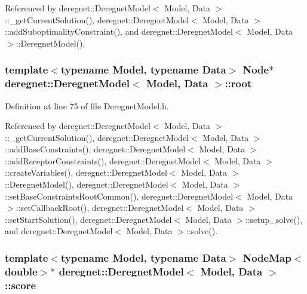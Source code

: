 Referenced by deregnet\+::\+Deregnet\+Model$<$ Model, Data $>$\+::\+\_\+get\+Current\+Solution(), deregnet\+::\+Deregnet\+Model$<$ Model, Data $>$\+::add\+Suboptimality\+Constraint(), and deregnet\+::\+Deregnet\+Model$<$ Model, Data $>$\+::\+Deregnet\+Model().

\subsubsection[{\texorpdfstring{root}{root}}]{\setlength{\rightskip}{0pt plus 5cm}template$<$typename Model, typename Data$>$ {\bf Node}$\ast$ {\bf deregnet\+::\+Deregnet\+Model}$<$ Model, {\bf Data} $>$\+::root\hspace{0.3cm}{\ttfamily [protected]}}\hypertarget{classderegnet_1_1DeregnetModel_a54b20393a0e26d65935d387685d7fe96}{}\label{classderegnet_1_1DeregnetModel_a54b20393a0e26d65935d387685d7fe96}


Definition at line 75 of file Deregnet\+Model.\+h.



Referenced by deregnet\+::\+Deregnet\+Model$<$ Model, Data $>$\+::\+\_\+get\+Current\+Solution(), deregnet\+::\+Deregnet\+Model$<$ Model, Data $>$\+::add\+Base\+Constraints(), deregnet\+::\+Deregnet\+Model$<$ Model, Data $>$\+::add\+Receptor\+Constraints(), deregnet\+::\+Deregnet\+Model$<$ Model, Data $>$\+::create\+Variables(), deregnet\+::\+Deregnet\+Model$<$ Model, Data $>$\+::\+Deregnet\+Model(), deregnet\+::\+Deregnet\+Model$<$ Model, Data $>$\+::set\+Base\+Constraints\+Root\+Common(), deregnet\+::\+Deregnet\+Model$<$ Model, Data $>$\+::set\+Callback\+Root(), deregnet\+::\+Deregnet\+Model$<$ Model, Data $>$\+::set\+Start\+Solution(), deregnet\+::\+Deregnet\+Model$<$ Model, Data $>$\+::setup\+\_\+solve(), and deregnet\+::\+Deregnet\+Model$<$ Model, Data $>$\+::solve().

\subsubsection[{\texorpdfstring{score}{score}}]{\setlength{\rightskip}{0pt plus 5cm}template$<$typename Model, typename Data$>$ {\bf Node\+Map}$<$double$>$$\ast$ {\bf deregnet\+::\+Deregnet\+Model}$<$ Model, {\bf Data} $>$\+::score\hspace{0.3cm}{\ttfamily [protected]}}\hypertarget{classderegnet_1_1DeregnetModel_a46224b0bda5bab796d3b7cb41c184a4d}{}\label{classderegnet_1_1DeregnetModel_a46224b0bda5bab796d3b7cb41c184a4d}


